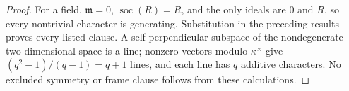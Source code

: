 
\begin{proof}
For a field, $\mathfrak m=0$, $\operatorname{soc}(R)=R$, and the only ideals
are $0$ and $R$, so every nontrivial character is generating.  Substitution
in the preceding results proves every listed clause.  A self-perpendicular
subspace of the nondegenerate two-dimensional space is a line; nonzero
vectors modulo $\kappa^\times$ give $(q^2-1)/(q-1)=q+1$ lines, and each line
has $q$ additive characters.  No excluded symmetry or frame clause follows
from these calculations.
\end{proof}
